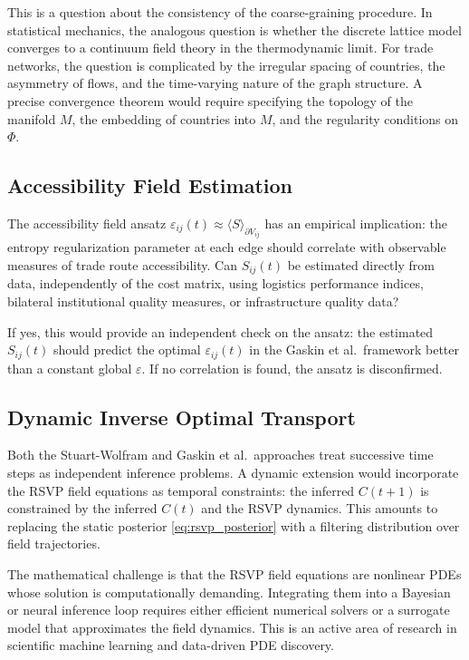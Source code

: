 \documentclass[12pt]{article}
\newcommand{\eps}{\varepsilon}
\begin{document}
This is a question about the consistency of the coarse-graining procedure. In statistical mechanics, the analogous question is whether the discrete lattice model converges to a continuum field theory in the thermodynamic limit. For trade networks, the question is complicated by the irregular spacing of countries, the asymmetry of flows, and the time-varying nature of the graph structure. A precise convergence theorem would require specifying the topology of the manifold $M$, the embedding of countries into $M$, and the regularity conditions on $\Phi$.

\subsection{Accessibility Field Estimation}

The accessibility field ansatz $\eps_{ij}(t) \approx \langle S \rangle_{\partial V_{ij}}$ has an empirical implication: the entropy regularization parameter at each edge should correlate with observable measures of trade route accessibility. Can $S_{ij}(t)$ be estimated directly from data, independently of the cost matrix, using logistics performance indices, bilateral institutional quality measures, or infrastructure quality data?

If yes, this would provide an independent check on the ansatz: the estimated $S_{ij}(t)$ should predict the optimal $\eps_{ij}(t)$ in the Gaskin et al.\ framework better than a constant global $\eps$. If no correlation is found, the ansatz is disconfirmed.

\subsection{Dynamic Inverse Optimal Transport}

Both the Stuart-Wolfram and Gaskin et al.\ approaches treat successive time steps as independent inference problems. A dynamic extension would incorporate the RSVP field equations as temporal constraints: the inferred $C(t+1)$ is constrained by the inferred $C(t)$ and the RSVP dynamics. This amounts to replacing the static posterior \eqref{eq:rsvp_posterior} with a filtering distribution over field trajectories.

The mathematical challenge is that the RSVP field equations are nonlinear PDEs whose solution is computationally demanding. Integrating them into a Bayesian or neural inference loop requires either efficient numerical solvers or a surrogate model that approximates the field dynamics. This is an active area of research in scientific machine learning and data-driven PDE discovery.
\end{document}
